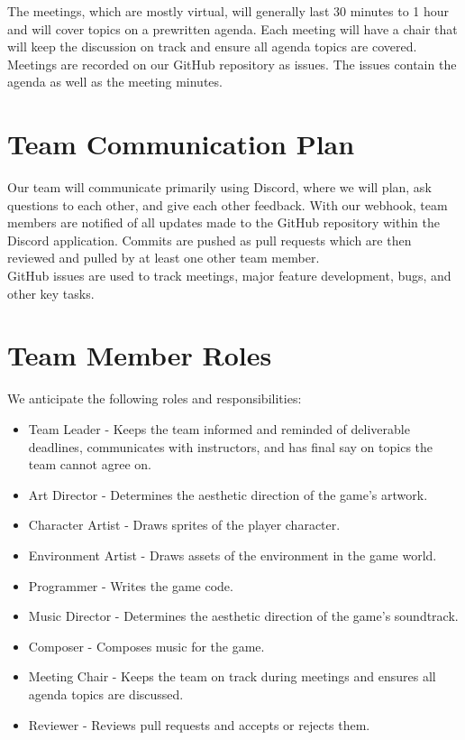 \documentclass{article}
\begin{document}
The meetings, which are mostly virtual, will generally last 30 minutes to 1 hour and will cover topics on a prewritten agenda. Each meeting will have a chair that will keep the discussion on track and ensure all agenda topics are covered. \\

Meetings are recorded on our GitHub repository as issues. The issues contain the agenda as well as the meeting minutes.\\


\section{Team Communication Plan}

Our team will communicate primarily using Discord, where we will plan, ask questions to each other, and give each other feedback. With our webhook, team members are notified of all updates made to the GitHub repository within the Discord application. Commits are pushed as pull requests which are then reviewed and pulled by at least one other team member.\\

GitHub issues are used to track meetings, major feature development, bugs, and other key tasks.\\


\section{Team Member Roles}

We anticipate the following roles and responsibilities:
\begin{itemize}
\item{Team Leader - Keeps the team informed and reminded of deliverable deadlines, communicates with instructors, and has final say on topics the team cannot agree on.}
\item{Art Director - Determines the aesthetic direction of the game’s artwork.}
\item{Character Artist - Draws sprites of the player character.}
\item{Environment Artist - Draws assets of the environment in the game world.}
\item{Programmer - Writes the game code.}
\item{Music Director - Determines the aesthetic direction of the game’s soundtrack.}
\item{Composer - Composes music for the game.}
\item{Meeting Chair - Keeps the team on track during meetings and ensures all agenda topics are discussed.}
\item{Reviewer - Reviews pull requests and accepts or rejects them.}
\end{itemize}
\end{document}
